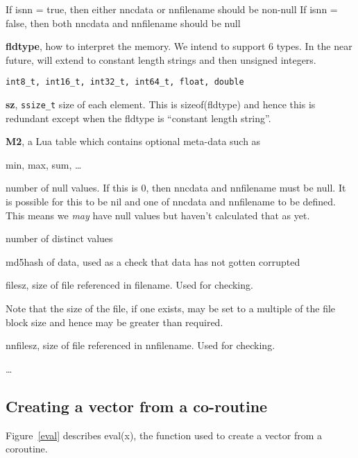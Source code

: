 If isnn = true, then either nncdata or nnfilename should be non-null
If isnn = false, then both nncdata and nnfilename should be null
\item {\bf fldtype}, how to interpret the memory. We intend to support 6 types.
In the near  future, will extend to constant length strings and then unsigned integers. 
\begin{verbatim}
int8_t, int16_t, int32_t, int64_t, float, double
\end{verbatim}

\item {\bf sz}, \verb+ssize_t+ size of each element. This is sizeof(fldtype) and
hence this is redundant except when the fldtype is ``constant length
string''.
\ee
\item {\bf M2}, a Lua table which contains optional meta-data such as 
\be
\item min, max, sum, \ldots
\item number of null values. If this is 0, then nncdata and nnfilename must be
null. It is possible for this to be nil and one of nncdata and nnfilename to be
defined. This means we {\em may} have null values but haven't calculated that as
yet. 
\item number of distinct values
\item md5hash of data, used as a check that data has not gotten corrupted
\item filesz, size of file referenced in filename. Used for checking.

Note that the size of the file, if one exists, may be set to a
multiple of the file block size and hence may be greater than
required.
\item nnfilesz, size of file referenced in nnfilename. Used for checking.
\item \ldots
\ee


\ee

\subsection{Creating a vector from a co-routine}
\label{vec_from_coro}

Figure~\ref{eval} describes eval(x), the function used to create a
vector from a coroutine.

